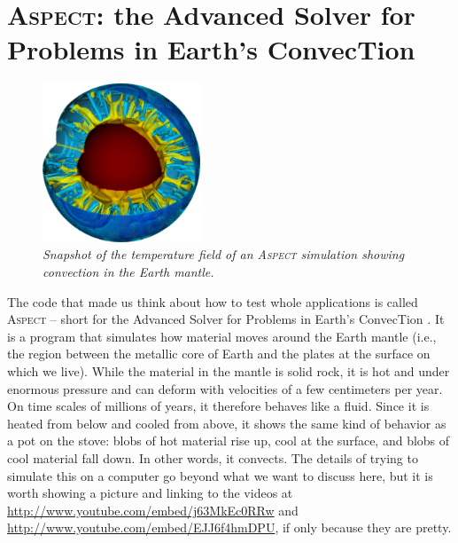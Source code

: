 \documentclass{article}
\newcommand{\aspect}{\textsc{Aspect}}
\begin{document}
\section{\aspect{}: the Advanced Solver for Problems in Earth's ConvecTion}
\label{sec:aspect}

\begin{figure}
  \begin{center}
    \vspace*{-24pt}
    \includegraphics[width=0.42\textwidth,height=0.42\textwidth]{figures/aspect.png}
    \vspace*{-12pt}
  \end{center}
  \caption{\it Snapshot of the temperature field of an \aspect{} simulation
    showing convection in the Earth mantle.}
  \vspace*{-3mm}
  \label{fig:aspect}
\end{figure}
The code that made us think about how to test whole applications is called
\aspect{} -- short for the Advanced Solver for Problems in Earth's ConvecTion
\cite{KHB12,aspectmanual,aspectweb}. It is a program that simulates how material moves around the Earth
mantle (i.e., the region between the metallic core of Earth and the plates at
the surface on which we live). While the material in the mantle is solid rock,
it is hot and under enormous pressure and can deform with velocities of a few
centimeters per year. On time scales of millions of years, it therefore
behaves like a fluid. Since it is heated from below and cooled from above, it
shows the same kind of behavior as a pot on the stove: blobs of hot material
rise up, cool at the surface, and blobs of cool material fall down. In other
words, it convects. The details of trying to simulate this on a computer go
beyond what we want to discuss here, but it is worth showing a picture and
linking to the videos at \url{http://www.youtube.com/embed/j63MkEc0RRw} and
\url{http://www.youtube.com/embed/EJJ6f4hmDPU}, if only because they are pretty.
\end{document}
